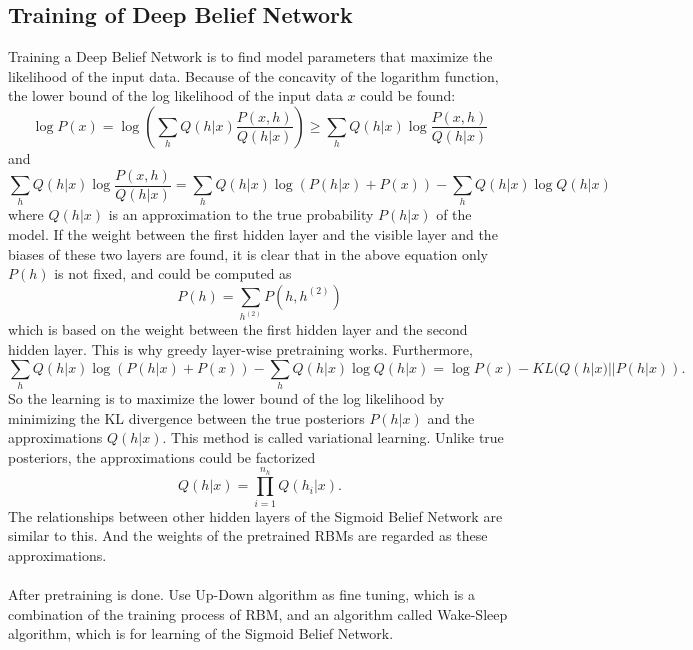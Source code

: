 \documentclass[12pt]{article}
\begin{document}
\subsection{Training of Deep Belief Network}
Training a Deep Belief Network is to find model parameters that maximize the likelihood of the input data. Because of the concavity of the logarithm function, the lower bound of the log likelihood of the input data $x$ could be found:\begin{equation}
\log P(x)=\log\left(\sum_h Q(h|x)\frac{P(x,h)}{Q(h|x)}\right)\geq \sum_h Q(h|x)\log\frac{P(x,h)}{Q(h|x)}
\end{equation}
and 
\begin{equation}
\sum_h Q(h|x)\log\frac{P(x,h)}{Q(h|x)}= \sum_h Q(h|x)\log(P(h|x) + P(x))-\sum_h Q(h|x)\log Q(h|x)
\end{equation}
where $Q(h|x)$ is an approximation to the true probability $P(h|x)$ of the model. If the weight between the first hidden layer and the visible layer and the biases of these two layers are found, it is clear that in the above equation only $P(h)$ is not fixed, and could be computed as \begin{equation}
P(h) = \sum_{h^{(2)}}P(h, h^{(2)})
\end{equation}
which is based on the weight between the first hidden layer and the second hidden layer. This is why greedy layer-wise pretraining works. Furthermore, \begin{equation}
\sum_h Q(h|x)\log(P(h|x) + P(x))-\sum_h Q(h|x)\log Q(h|x) = \log P(x) - KL(Q(h|x)||P(h|x)).
\end{equation}
So the learning is to maximize the lower bound of the log likelihood by minimizing the KL divergence between the true posteriors $P(h|x)$ and the approximations $Q(h|x)$. This method is called variational learning. Unlike true posteriors, the approximations could be factorized\begin{equation}
Q(h|x)=\prod_{i=1}^{n_h} Q(h_i|x).
\end{equation}
The relationships between other hidden layers of the Sigmoid Belief Network are similar to this. And the weights of the pretrained RBMs are regarded as these approximations.\\
\\
After pretraining is done. Use Up-Down algorithm as fine tuning, which is a combination of the training process of RBM, and an algorithm called Wake-Sleep algorithm, which is for learning of the Sigmoid Belief Network.
\end{document}
